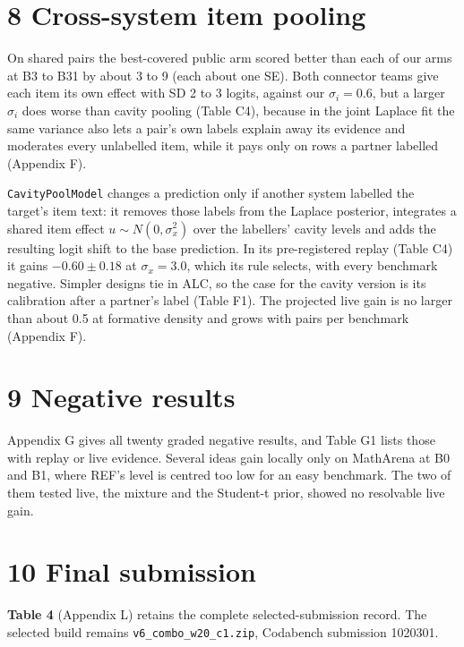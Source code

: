 \documentclass[
]{article}
\begin{document}
\section{8 Cross-system item pooling}\label{cross-system-item-pooling}

On shared pairs the best-covered public arm scored better than each of
our arms at B3 to B31 by about 3 to 9 (each about one SE). Both
connector teams give each item its own effect with SD 2 to 3 logits,
against our \(\sigma_i = 0.6\), but a larger \(\sigma_i\) does worse
than cavity pooling (Table C4), because in the joint Laplace fit the
same variance also lets a pair's own labels explain away its evidence
and moderates every unlabelled item, while it pays only on rows a
partner labelled (Appendix F).

\texttt{CavityPoolModel} changes a prediction only if another system
labelled the target's item text: it removes those labels from the
Laplace posterior, integrates a shared item effect
\(u \sim N(0, \sigma_x^2)\) over the labellers' cavity levels and adds
the resulting logit shift to the base prediction. In its pre-registered
replay (Table C4) it gains \(-0.60 \pm
0.18\) at \(\sigma_x = 3.0\), which its rule selects, with every
benchmark negative. Simpler designs tie in ALC, so the case for the
cavity version is its calibration after a partner's label (Table F1).
The projected live gain is no larger than about 0.5 at formative density
and grows with pairs per benchmark (Appendix F).

\section{9 Negative results}\label{negative-results}

Appendix G gives all twenty graded negative results, and Table G1 lists
those with replay or live evidence. Several ideas gain locally only on
MathArena at B0 and B1, where REF's level is centred too low for an easy
benchmark. The two of them tested live, the mixture and the Student-t
prior, showed no resolvable live gain.

\section{10 Final submission}\label{final-submission}

\textbf{Table 4} (Appendix L) retains the complete selected-submission
record. The selected build remains \texttt{v6\_combo\_w20\_c1.zip},
Codabench submission 1020301.
\end{document}

